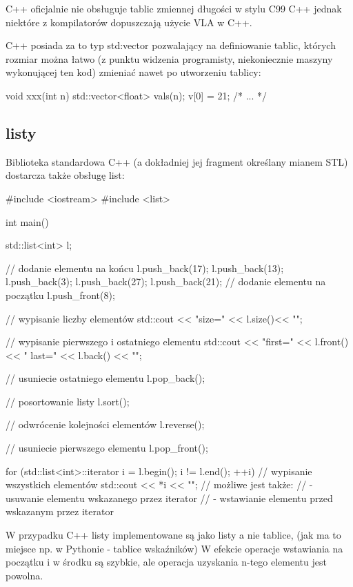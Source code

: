 C++ oficjalnie nie obsługuje tablic zmiennej długości w stylu C99 C++
jednak niektóre z kompilatorów dopuszczają użycie VLA w C++.

C++ posiada za to typ std:vector pozwalający na definiowanie tablic,
których rozmiar można łatwo (z punktu widzenia programisty, niekoniecznie
maszyny wykonującej ten kod) zmieniać nawet po utworzeniu tablicy:
\begin{CodeFrame*}[cpp]{}
void xxx(int n) {
    std::vector<float> vals(n);
    v[0] = 21;
    /* ... */
}
\end{CodeFrame*}


\subsection{listy}

Biblioteka standardowa C++ (a dokładniej jej fragment określany mianem STL) dostarcza także obsługę list:

\begin{CodeFrame*}[cpp]{}
#include <iostream>
#include <list>

int main() {
    std::list<int> l;
    
    // dodanie elementu na końcu
    l.push_back(17);
    l.push_back(13);
    l.push_back(3);
    l.push_back(27);
    l.push_back(21);
    // dodanie elementu na początku
    l.push_front(8);
    
    // wypisanie liczby elementów
    std::cout << "size=" << l.size()<< "\n";
    
    // wypisanie pierwszego i ostatniego elementu
    std::cout << "first=" << l.front() << " last=" << l.back() << "\n";
    
    // usuniecie ostatniego elementu
    l.pop_back();
    
    // posortowanie listy
    l.sort();
    
    // odwrócenie kolejności elementów
    l.reverse();
    
    // usuniecie pierwszego elementu
    l.pop_front();
    
    for (std::list<int>::iterator i = l.begin(); i != l.end(); ++i) {
        // wypisanie wszystkich elementów
        std::cout << *i << "\n";
        // możliwe jest także:
        //  - usuwanie elementu wskazanego przez iterator
        //  - wstawianie elementu przed wskazanym przez iterator
    }
}
\end{CodeFrame*}

W przypadku C++ listy implementowane są jako listy a nie tablice,
(jak ma to miejsce np. w Pythonie - tablice wskaźników)
W efekcie operacje wstawiania na początku i w środku są szybkie,
ale operacja uzyskania n-tego elementu jest powolna.

